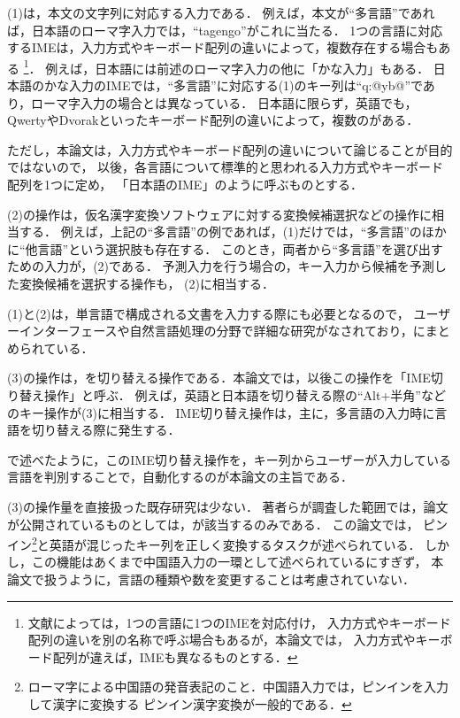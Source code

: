 \documentclass[japanese]{jnlp_1.4}
\newcommand{\secref}[1]{}
\renewcommand{\text}{}
\newcommand{\tes}{}
\begin{document}
(1)は，本文の文字列に対応する入力である．
例えば，本文が``多言語''であれば，日本語のローマ字入力では，``tagengo''がこれに当たる．
1つの言語に対応するIMEは，入力方式やキーボード配列の違いによって，複数存在する場合もある
\footnote{文献によっては，1つの言語に1つのIMEを対応付け，
入力方式やキーボード配列の違いを別の名称で呼ぶ場合もあるが，本論文では，
入力方式やキーボード配列が違えば，IMEも異なるものとする．}．
例えば，日本語には前述のローマ字入力の他に「かな入力」もある．
日本語のかな入力のIMEでは，``多言語''に対応する(1)のキー列は``q:@yb@''であり，ローマ字入力の場合とは異なっている．
日本語に限らず，英語でも，QwertyやDvorakといったキーボード配列の違いによって，複数の{\tes}がある．

ただし，本論文は，入力方式やキーボード配列の違いについて論じることが目的ではないので，
以後，各言語について標準的と思われる入力方式やキーボード配列を1つに定め，
「日本語のIME」のように呼ぶものとする．

(2)の操作は，仮名漢字変換ソフトウェアに対する変換候補選択などの操作に相当する．
例えば，上記の``多言語''の例であれば，(1)だけでは，``多言語''のほかに``他言語''という選択肢も存在する．
このとき，両者から``多言語''を選び出すための入力が，(2)である．
予測入力を行う場合の，キー入力から候補を予測した変換候補を選択する操作も，
(2)に相当する．

(1)と(2)は，単言語で構成される文書を入力する際にも必要となるので，
ユーザーインターフェースや自然言語処理の分野で詳細な研究がなされており，\cite{entry}にまとめられている．

(3)の操作は，{\tes}を切り替える操作である．本論文では，以後この操作を「IME切り替え操作」と呼ぶ．
例えば，英語と日本語を切り替える際の``Alt+半角''などのキー操作が(3)に相当する．
IME切り替え操作は，主に，多言語{\text}の入力時に言語を切り替える際に発生する．

\secref{sec:introduction}で述べたように，このIME切り替え操作を，キー列からユーザーが入力している
言語を判別することで，自動化するのが本論文の主旨である．



(3)の操作量を直接扱った既存研究は少ない．
著者らが調査した範囲では，論文が公開されているものとしては，\cite{pinyininput}が該当するのみである．
この論文では，
ピンイン\footnote{ローマ字による中国語の発音表記のこと．中国語入力では，ピンインを入力して漢字に変換する
ピンイン漢字変換が一般的である．}と英語が混じったキー列を正しく変換するタスクが述べられている．
しかし，この機能はあくまで中国語入力の一環として述べられているにすぎず，
本論文で扱うように，言語の種類や数を変更することは考慮されていない．
\end{document}
